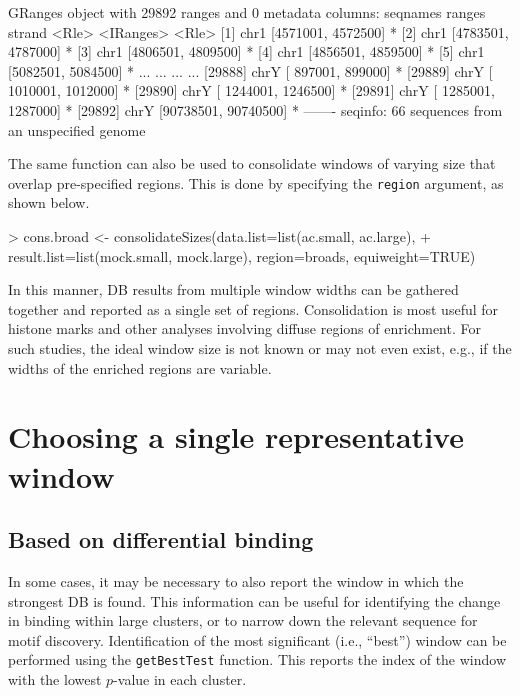 \documentclass[12pt]{report}
\renewenvironment{Schunk}{\vspace{0pt}}{\vspace{0pt}}
\newcommand{\code}[1]{{\small\texttt{#1}}}
\begin{document}
\begin{Schunk}
\begin{Soutput}
GRanges object with 29892 ranges and 0 metadata columns:
          seqnames               ranges strand
             <Rle>            <IRanges>  <Rle>
      [1]     chr1   [4571001, 4572500]      *
      [2]     chr1   [4783501, 4787000]      *
      [3]     chr1   [4806501, 4809500]      *
      [4]     chr1   [4856501, 4859500]      *
      [5]     chr1   [5082501, 5084500]      *
      ...      ...                  ...    ...
  [29888]     chrY [  897001,   899000]      *
  [29889]     chrY [ 1010001,  1012000]      *
  [29890]     chrY [ 1244001,  1246500]      *
  [29891]     chrY [ 1285001,  1287000]      *
  [29892]     chrY [90738501, 90740500]      *
  -------
  seqinfo: 66 sequences from an unspecified genome
\end{Soutput}
\end{Schunk}

The same function can also be used to consolidate windows of varying size that overlap pre-specified regions.
This is done by specifying the \code{region} argument, as shown below.

\begin{Schunk}
\begin{Sinput}
> cons.broad <- consolidateSizes(data.list=list(ac.small, ac.large),
+     result.list=list(mock.small, mock.large), region=broads, equiweight=TRUE)
\end{Sinput}
\end{Schunk}

In this manner, DB results from multiple window widths can be gathered together and reported as a single set of regions.
Consolidation is most useful for histone marks and other analyses involving diffuse regions of enrichment.
For such studies, the ideal window size is not known or may not even exist, e.g., if the widths of the enriched regions are variable.

\section{Choosing a single representative window}

\subsection{Based on differential binding}
In some cases, it may be necessary to also report the window in which the strongest DB is found.
This information can be useful for identifying the change in binding within large clusters, or to narrow down the relevant sequence for motif discovery.
Identification of the most significant (i.e., ``best'') window can be performed using the \code{getBestTest} function.
This reports the index of the window with the lowest $p$-value in each cluster.
\end{document}
